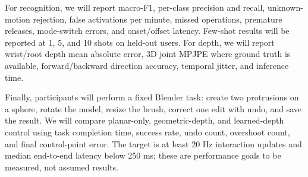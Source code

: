 \documentclass{article}
\begin{document}
For recognition, we will report macro-F1, per-class precision and recall,
unknown-motion rejection, false activations per minute, missed operations,
premature releases, mode-switch errors, and onset/offset latency. Few-shot
results will be reported at 1, 5, and 10 shots on held-out users. For depth, we
will report wrist/root depth mean absolute error, 3D joint MPJPE where ground
truth is available, forward/backward direction accuracy, temporal jitter, and
inference time.

Finally, participants will perform a fixed Blender task: create two
protrusions on a sphere, rotate the model, resize the brush, correct one edit
with undo, and save the result. We will compare planar-only, geometric-depth,
and learned-depth control using task completion time, success rate, undo count,
overshoot count, and final control-point error. The target is at least 20 Hz
interaction updates and median end-to-end latency below 250 ms; these are
performance goals to be measured, not assumed results.
\end{document}
